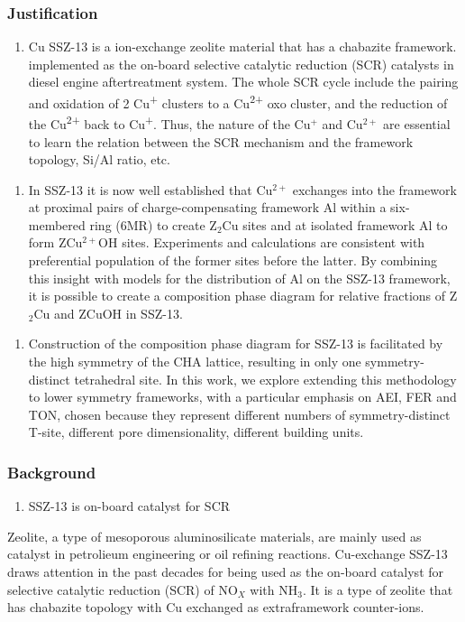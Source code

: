 \documentclass[12pt]{article}
\begin{document}
\subsubsection*{Justification}
\begin{enumerate}
\item Cu SSZ-13 is a ion-exchange zeolite material that has a chabazite framework. implemented as the on-board selective catalytic reduction (SCR) catalysts in diesel engine aftertreatment system. The whole SCR cycle include the pairing and oxidation of 2 Cu\textsuperscript{+} clusters to a Cu\textsuperscript{2+} oxo cluster, and the reduction of the Cu\textsuperscript{2+} back to Cu\textsuperscript{+}. Thus, the nature of the Cu$^{+}$ and Cu$^{2+}$ are essential to learn the relation between the SCR mechanism and the framework topology, Si/Al ratio, etc.
\end{enumerate}

\begin{enumerate}[resume]
\item In SSZ-13 it is now well established that Cu$^{2+}$ exchanges into the framework at proximal pairs of charge-compensating framework Al within a six-membered ring (6MR) to create Z$_{2}$Cu sites and at isolated framework Al to form ZCu$^{2+}$OH sites.\cite{Paolucci2016}  Experiments and calculations are consistent with preferential population of the former sites before the latter. By combining this insight with models for the distribution of Al on the SSZ-13 framework, it is possible to create a composition phase diagram for relative fractions of Z$_{2}$Cu and ZCuOH in SSZ-13.\cite{Paolucci2016}
\end{enumerate}

\begin{enumerate}[resume]
\item Construction of the composition phase diagram for SSZ-13 is facilitated by the high symmetry of the CHA lattice, resulting in only one symmetry-distinct tetrahedral site. In this work, we explore extending this  methodology to lower symmetry frameworks, with a particular emphasis on AEI, FER and TON, chosen because they represent different numbers of symmetry-distinct T-site, different pore dimensionality, different building units.
\end{enumerate}

\subsubsection*{Background}
\begin{enumerate}
\item SSZ-13 is on-board catalyst for SCR
\end{enumerate}
Zeolite, a type of mesoporous aluminosilicate materials, are mainly used as catalyst in petrolieum engineering or oil refining reactions. Cu-exchange SSZ-13 draws attention in the past decades for being used as the on-board catalyst for selective catalytic reduction (SCR) of NO$_{X}$ with NH$_{3}$.\cite{Paolucci2016,Paolucciscience,Paoluccichapter,Paolucci2014} It is a type of zeolite that has chabazite topology with Cu exchanged  as extraframework counter-ions.
 
\end{document}
